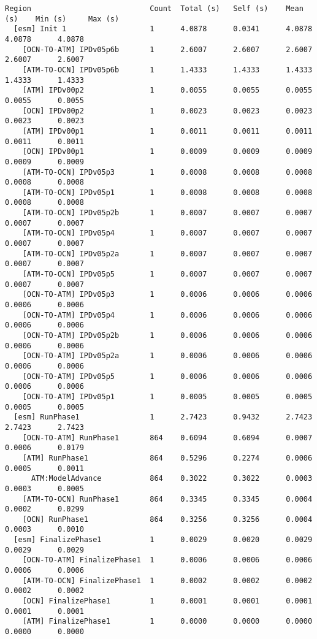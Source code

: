 \begin{verbatim}
Region                           Count  Total (s)   Self (s)    Mean (s)    Min (s)     Max (s)
  [esm] Init 1                   1      4.0878      0.0341      4.0878      4.0878      4.0878
    [OCN-TO-ATM] IPDv05p6b       1      2.6007      2.6007      2.6007      2.6007      2.6007
    [ATM-TO-OCN] IPDv05p6b       1      1.4333      1.4333      1.4333      1.4333      1.4333
    [ATM] IPDv00p2               1      0.0055      0.0055      0.0055      0.0055      0.0055
    [OCN] IPDv00p2               1      0.0023      0.0023      0.0023      0.0023      0.0023
    [ATM] IPDv00p1               1      0.0011      0.0011      0.0011      0.0011      0.0011
    [OCN] IPDv00p1               1      0.0009      0.0009      0.0009      0.0009      0.0009
    [ATM-TO-OCN] IPDv05p3        1      0.0008      0.0008      0.0008      0.0008      0.0008
    [ATM-TO-OCN] IPDv05p1        1      0.0008      0.0008      0.0008      0.0008      0.0008
    [ATM-TO-OCN] IPDv05p2b       1      0.0007      0.0007      0.0007      0.0007      0.0007
    [ATM-TO-OCN] IPDv05p4        1      0.0007      0.0007      0.0007      0.0007      0.0007
    [ATM-TO-OCN] IPDv05p2a       1      0.0007      0.0007      0.0007      0.0007      0.0007
    [ATM-TO-OCN] IPDv05p5        1      0.0007      0.0007      0.0007      0.0007      0.0007
    [OCN-TO-ATM] IPDv05p3        1      0.0006      0.0006      0.0006      0.0006      0.0006
    [OCN-TO-ATM] IPDv05p4        1      0.0006      0.0006      0.0006      0.0006      0.0006
    [OCN-TO-ATM] IPDv05p2b       1      0.0006      0.0006      0.0006      0.0006      0.0006
    [OCN-TO-ATM] IPDv05p2a       1      0.0006      0.0006      0.0006      0.0006      0.0006
    [OCN-TO-ATM] IPDv05p5        1      0.0006      0.0006      0.0006      0.0006      0.0006
    [OCN-TO-ATM] IPDv05p1        1      0.0005      0.0005      0.0005      0.0005      0.0005
  [esm] RunPhase1                1      2.7423      0.9432      2.7423      2.7423      2.7423
    [OCN-TO-ATM] RunPhase1       864    0.6094      0.6094      0.0007      0.0006      0.0179
    [ATM] RunPhase1              864    0.5296      0.2274      0.0006      0.0005      0.0011
      ATM:ModelAdvance           864    0.3022      0.3022      0.0003      0.0003      0.0005
    [ATM-TO-OCN] RunPhase1       864    0.3345      0.3345      0.0004      0.0002      0.0299
    [OCN] RunPhase1              864    0.3256      0.3256      0.0004      0.0003      0.0010
  [esm] FinalizePhase1           1      0.0029      0.0020      0.0029      0.0029      0.0029
    [OCN-TO-ATM] FinalizePhase1  1      0.0006      0.0006      0.0006      0.0006      0.0006
    [ATM-TO-OCN] FinalizePhase1  1      0.0002      0.0002      0.0002      0.0002      0.0002
    [OCN] FinalizePhase1         1      0.0001      0.0001      0.0001      0.0001      0.0001
    [ATM] FinalizePhase1         1      0.0000      0.0000      0.0000      0.0000      0.0000
\end{verbatim}

